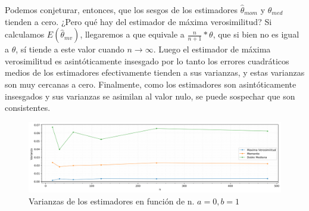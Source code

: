 Podemos conjeturar, entonces, que los sesgos de los estimadores $\hat{\theta}_{mom}$ y $\hat{\theta}_{med}$ tienden a cero. ¿Pero qué hay del estimador de máxima verosimilitud? Si calculamos $E(\hat{\theta}_{mv})$, llegaremos a que equivale a $\frac{n}{n+1} * \theta$, que si bien no es igual a $\theta$, sí tiende a este valor cuando $n \rightarrow \infty$. Luego el estimador de máxima verosimilitud es asintóticamente insesgado por lo tanto los errores cuadráticos medios de los estimadores efectivamente tienden a sus varianzas, y estas varianzas son muy cercanas a cero. Finalmente, como los estimadores son asintóticamente insesgados y sus varianzas se asimilan al valor nulo, se puede sospechar que son consistentes.

\begin{figure}[H]
	\centering
	\includegraphics[width=1\textwidth]{imagenes/varianzas-en-f-de-n-small.png}
	\caption{\footnotesize Varianzas de los estimadores en función de n. $a=0, b=1$}
	\label{fig:ej7-varianzas-en-f-de-n-small}
\end{figure}